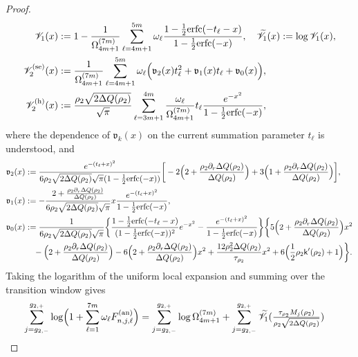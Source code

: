 \documentclass[a4paper]{article}
\newcommand{\erfc}{{\rm erfc}}
\numberwithin{equation}{section}
\begin{document}
\begin{proof}
\begin{align*}
\mathscr{V}_1(x)
&:=1-\frac{1}{\Omega_{4m+1}^{(7m)}}\sum_{\ell=4m+1}^{5m}\omega_{\ell}
\frac{1-\frac{1}{2}\erfc(-t_{\ell}-x)}{1-\frac{1}{2}\erfc(-x)}, 
\quad
\widetilde{\mathscr{V}}_1(x)
:=\log \mathscr{V}_1(x),
\\
\mathscr{V}_2^{(\mathrm{se})}(x)
&:=
\frac{1}{\Omega_{4m+1}^{(7m)}}\sum_{\ell=4m+1}^{5m}\omega_{\ell}
\Bigl( 
\mathfrak{v}_2(x)t_{\ell}^2
+
\mathfrak{v}_1(x)t_{\ell}
+
\mathfrak{v}_0(x)
\Bigr), 
\\
\mathscr{V}_2^{(\mathrm{h})}(x)
&:=
\frac{\rho_2\sqrt{2\Delta Q(\rho_2)}}{\sqrt{\pi}}
\sum_{\ell=3m+1}^{4m}
\frac{\omega_{\ell}}{\Omega_{4m+1}^{(7m)}}t_{\ell}
\frac{e^{-x^2}}{1-\frac{1}{2}\erfc(-x)},
\end{align*}
where the dependence of $\mathfrak v_k(x)$ on the current summation parameter
$t_\ell$ is understood, and
\begin{align*}
\mathfrak{v}_2(x)
&:=
\frac{e^{-(t_{\ell}+x)^2}}{6\rho_2\sqrt{2\Delta Q(\rho_2)}\sqrt{\pi}(1-\frac{1}{2}\erfc(-x))}
\bigg[ 
-2\Bigl(2+\frac{\rho_2\partial_r\Delta Q(\rho_2)}{\Delta Q(\rho_2)}\Bigr)
+3\Bigl(1+\frac{\rho_2\partial_r\Delta Q(\rho_2)}{\Delta Q(\rho_2)}\Bigr)
\bigg], 
\\
\mathfrak{v}_1(x)
&:=
-\frac{2+\frac{\rho_2\partial_r\Delta Q(\rho_2)}{\Delta Q(\rho_2)}}{6\rho_2\sqrt{2\Delta Q(\rho_2)}\sqrt{\pi}}x
\frac{e^{-(t_{\ell}+x)^2}}{1-\frac{1}{2}\erfc(-x)}
,
\\
\mathfrak{v}_0(x)
&:=
\frac{1}{6\rho_2\sqrt{2\Delta Q(\rho_2)}\sqrt{\pi}}
\bigg\{
\frac{1-\frac{1}{2}\erfc(-t_{\ell}-x)}{(1-\frac{1}{2}\erfc(-x))^2}e^{-x^2}
-\frac{e^{-(t_{\ell}+x)^2}}{1-\frac{1}{2}\erfc(-x)}
\bigg\}
\bigg\{
5\Bigl(2+\frac{\rho_2\partial_r\Delta Q(\rho_2)}{\Delta Q(\rho_2)}\Bigr)x^2
\\
&\quad 
-\Bigl(2+\frac{\rho_2\partial_r\Delta Q(\rho_2)}{\Delta Q(\rho_2)}\Bigr)
-6\Bigl(2+\frac{\rho_2\partial_r\Delta Q(\rho_2)}{\Delta Q(\rho_2)}\Bigr)x^2
+\frac{12\rho_2^2\Delta Q(\rho_2)}{\tau_{\rho_2}}x^2
+6\Bigl(\frac{1}{2}\rho_2\mathsf{k}'(\rho_2)+1\Bigr)
\bigg\}. 
\end{align*}
Taking the logarithm of the uniform local expansion and summing over the
transition window gives
\begin{align*}
\sum_{j=g_{2,-}}^{g_{2,+}}\log\Bigl(1+\sum_{\ell=1}^{7m}\omega_{\ell}F_{n,j,\ell}^{(\mathrm{an})}\Bigr)
&=
\sum_{j=g_{2,-}}^{g_{2,+}}\log\Omega_{4m+1}^{(7m)}
+
\sum_{j=g_{2,-}}^{g_{2,+}}\widetilde{\mathscr{V}}_1(\tfrac{\tau_{\rho_2}M_{j}(\rho_2)}{\rho_2\sqrt{2\Delta Q(\rho_2)}})

\end{align*}
\end{proof}
\end{document}
